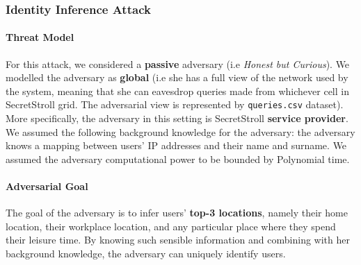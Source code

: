 \documentclass[10pt,conference,compsocconf]{IEEEtran}
\begin{document}
\subsubsection{Identity Inference Attack}


\paragraph{Threat Model}
For this attack, we considered a \textbf{passive} adversary (i.e \textit{Honest
but Curious}). We modelled the adversary as \textbf{global} (i.e she has a full
view of the network used by the system, meaning that she can eavesdrop queries
made from whichever cell in SecretStroll grid. The adversarial view is
represented by \texttt{queries.csv} dataset). More specifically, the adversary
in this setting is SecretStroll \textbf{service provider}.\newline
We assumed the following background knowledge for the adversary: the adversary
knows a mapping between users' IP addresses and their name and surname.\newline
We assumed the adversary computational power to be bounded by Polynomial time.


\paragraph{Adversarial Goal}
The goal of the adversary is to infer users' \textbf{top-3 locations}, namely
their home location, their workplace location, and any particular place where
they spend their leisure time. By knowing such sensible information and
combining with her background knowledge, the adversary can uniquely identify
users.
\end{document}
